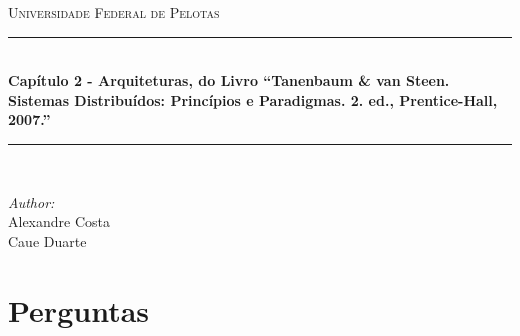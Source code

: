 \documentclass[12pt]{article} %
\begin{document}

\begin{titlepage}

\newcommand{\HRule}{\rule{\linewidth}{0.5mm}} %

\center %

\textsc{\LARGE Universidade Federal de Pelotas}\\[1.5cm] %

\HRule \\[0.4cm]
{ \huge \bfseries Capítulo 2 - Arquiteturas, do Livro “Tanenbaum & van Steen. Sistemas Distribuídos: Princípios e Paradigmas. 2. ed., Prentice-Hall, 2007.”}\\[0.4cm] %
\HRule \\[1.5cm]

\begin{minipage}{0.4\textwidth}
\begin{flushleft} \large
\emph{Author:}\\
Alexandre Costa\\
Caue Duarte
\end{flushleft}
\end{minipage}

\vfill %

\end{titlepage}





\section{Perguntas} %
\end{document}
